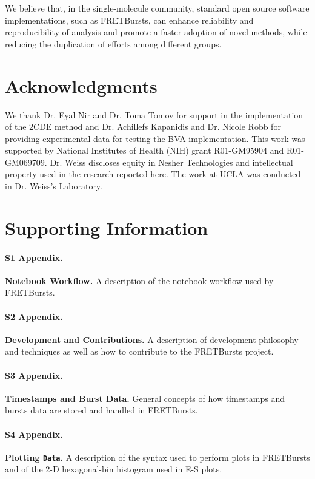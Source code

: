 \documentclass[10pt,letterpaper]{article}
\begin{document}
We believe that, in the single-molecule community,
standard open source software implementations, such as FRETBursts, can enhance
reliability and reproducibility of analysis and promote a faster adoption of novel methods,
while reducing the duplication of efforts among different groups.

\section*{Acknowledgments}
We thank Dr. Eyal Nir and Dr. Toma Tomov for support in the implementation of the 2CDE method and Dr. Achillefs Kapanidis and Dr. Nicole Robb for providing 
experimental data for testing the BVA implementation.
This work was supported by National Institutes of Health (NIH)
grant R01-GM95904 and R01-GM069709. Dr. Weiss discloses equity in
Nesher Technologies and intellectual property used in the research
reported here. The work at UCLA was conducted in Dr. Weiss's Laboratory.

\section*{Supporting Information}


\paragraph*{S1 Appendix.}
\label{sec:notebook}
{\bf Notebook Workflow.} A description of the notebook workflow used by FRETBursts.

\paragraph*{S2 Appendix.}
\label{sec:dev}
{\bf Development and Contributions.} A description of development philosophy and techniques
as well as how to contribute to the FRETBursts project.

\paragraph*{S3 Appendix.}
\label{sec:burststimes}
{\bf Timestamps and Burst Data.} General concepts of how timestamps and
bursts data are stored and handled in FRETBursts.

\paragraph*{S4 Appendix.}
\label{sec:plotting}
{\bf Plotting \texttt{Data}.} A description of the syntax used to perform
plots in FRETBursts and of the 2-D hexagonal-bin histogram used in E-S plots.
\end{document}
